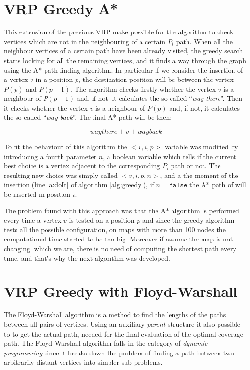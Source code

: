 \section{VRP Greedy A*}

This extension of the previous VRP make possible for the algorithm to check vertices which are not in the neighbouring of a certain $P_i$ path. When all the neighbour vertices of a certain path have been already visited, the greedy search starts looking for all the remaining vertices, and it finds a way through the graph using the A* path-finding algorithm. In particular if we consider the insertion of a vertex $v$ in a position $p$, the destination position will be between the vertex $P(p)$ and $P(p-1)$. The algorithm checks firstly whether the vertex $v$ is a neighbour of $P(p-1)$ and, if not, it calculates the so called ``\emph{way there}''. Then it checks whether the vertex $v$ is a neighbour of $P(p)$ and, if not, it calculates the so called ``\emph{way back}''. The final A* path will be then:

\begin{equation}
way there + v + way back \label{e:astarpath}
\end{equation}

To fit the behaviour of this algorithm the \mbox{$<v,i,p>$} variable was modified by introducing a fourth parameter $n$, a boolean variable which tells if the current best choice is a vertex adjacent to the corresponding $P_i$ path or not. The resulting new choice was simply called \mbox{$<v,i,p,n>$}, and a the moment of the insertion (line \ref{a:doIt} of algorithm \ref{alg:greedy}), if $n=\texttt{false}$ the A* path of will be inserted in position $i$.

The problem found with this approach was that the A* algorithm is performed every time a vertex $v$ is tested on a position $p$ and since the greedy algorithm tests all the possible configuration, on maps with more than 100 nodes the computational time started to be too big. Moreover if assume the map is not changing, which we are, there is no need of computing the shortest path every time, and that's why the next algorithm was developed.


\section{VRP Greedy with Floyd-Warshall}

The Floyd-Warshall algorithm is a method to find the lengths of the paths between all pairs of vertices. Using an auxiliary \textit{parent} structure it also possible to to get the actual path, needed for the final evaluation of the optimal coverage path. The Floyd-Warshall algorithm falls in the category of \textit{dynamic programming} since it breaks down the problem of finding a path between two arbitrarily distant vertices into simpler sub-problems.

